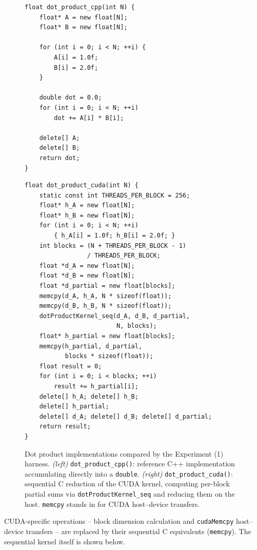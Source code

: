 \documentclass{article}
\begin{document}
\begin{figure}[H]
\begin{minipage}[t]{0.48\linewidth}
\begin{verbatim}
float dot_product_cpp(int N) {
    float* A = new float[N];
    float* B = new float[N];

    for (int i = 0; i < N; ++i) {
        A[i] = 1.0f;
        B[i] = 2.0f;
    }

    double dot = 0.0;
    for (int i = 0; i < N; ++i)
        dot += A[i] * B[i];

    delete[] A;
    delete[] B;
    return dot;
}
\end{verbatim}
\end{minipage}
\hfill
\begin{minipage}[t]{0.48\linewidth}
\begin{verbatim}
float dot_product_cuda(int N) {
    static const int THREADS_PER_BLOCK = 256;
    float* h_A = new float[N];
    float* h_B = new float[N];
    for (int i = 0; i < N; ++i)
        { h_A[i] = 1.0f; h_B[i] = 2.0f; }
    int blocks = (N + THREADS_PER_BLOCK - 1)
                 / THREADS_PER_BLOCK;
    float *d_A = new float[N];
    float *d_B = new float[N];
    float *d_partial = new float[blocks];
    memcpy(d_A, h_A, N * sizeof(float));
    memcpy(d_B, h_B, N * sizeof(float));
    dotProductKernel_seq(d_A, d_B, d_partial,
                         N, blocks);
    float* h_partial = new float[blocks];
    memcpy(h_partial, d_partial,
           blocks * sizeof(float));
    float result = 0;
    for (int i = 0; i < blocks; ++i)
        result += h_partial[i];
    delete[] h_A; delete[] h_B;
    delete[] h_partial;
    delete[] d_A; delete[] d_B; delete[] d_partial;
    return result;
}
\end{verbatim}
\end{minipage}
\caption{Dot product implementations compared by the Experiment (1) harness. \textit{(left)} \texttt{dot\_product\_cpp()}: reference C++ implementation accumulating directly into a \texttt{double}. \textit{(right)} \texttt{dot\_product\_cuda()}: sequential C reduction of the CUDA kernel, computing per-block partial sums via \texttt{dotProductKernel\_seq} and reducing them on the host. \texttt{memcpy} stands in for CUDA host--device transfers.}
\label{fig:dotprod-cpp-cuda-pair}
\end{figure}

CUDA-specific operations -- block dimension calculation and \texttt{cudaMemcpy} host--device transfers -- are replaced by their sequential C equivalents (\texttt{memcpy}). The sequential kernel itself is shown below.
\end{document}
